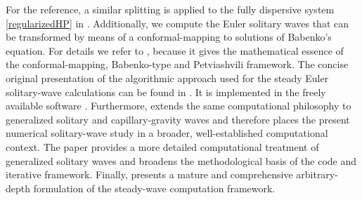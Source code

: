 \documentclass[reqno,12pt,a4paper]{article}
\theoremstyle{plain}
\begin{document}
For the reference,
a similar splitting is applied to
the fully dispersive system \eqref{regularizedHP} in \cite{Dinvay}.
Additionally, we compute the Euler solitary waves
that can be transformed by means of a conformal-mapping to solutions of Babenko's equation.
For details we refer to \cite{Dutykh_Clamond2014},
because it gives the mathematical essence of the conformal-mapping,
Babenko-type and Petviashvili framework.
The concise original presentation of the algorithmic approach used
for the steady Euler solitary-wave calculations can be found in \cite{Clamond_Dutykh2013}.
It is implemented in the freely available
software \cite{Dutykh_code}.
Furthermore,
\cite{Clamond_Dutykh_Duran2015}
extends the same computational philosophy
to generalized solitary and capillary-gravity waves and therefore places the present
numerical solitary-wave study in a broader, well-established computational context.
The paper \cite{Dutykh_Clamond_Duran2016} provides a more detailed computational
treatment of generalized solitary waves and broadens the methodological basis of the code
and iterative framework.
Finally, \cite{Clamond_Dutykh2018} presents a mature and comprehensive
arbitrary-depth formulation of the steady-wave computation framework.
\end{document}
